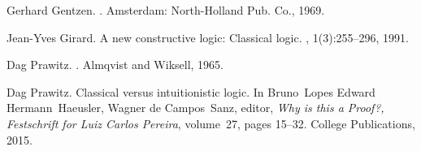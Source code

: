 \documentclass[bsl,meeting]{asl}
\begin{document}
\begin{thebibliography}{10}

Gerhard Gentzen.
.
\newblock Amsterdam: North-Holland Pub. Co., 1969.

Jean{-}Yves Girard.
\newblock A new constructive logic: Classical logic.
, 1(3):255--296, 1991.

Dag Prawitz.
.
\newblock Almqvist and Wiksell, 1965.

Dag Prawitz.
\newblock Classical versus intuitionistic logic.
\newblock In Bruno~Lopes Edward Hermann~Haeusler, Wagner de Campos~Sanz,
  editor, {\em Why is this a Proof?, Festschrift for Luiz Carlos Pereira},
  volume~27, pages 15--32. College Publications, 2015.

\end{thebibliography}


\vspace*{-0.5\baselineskip}
\end{document}
